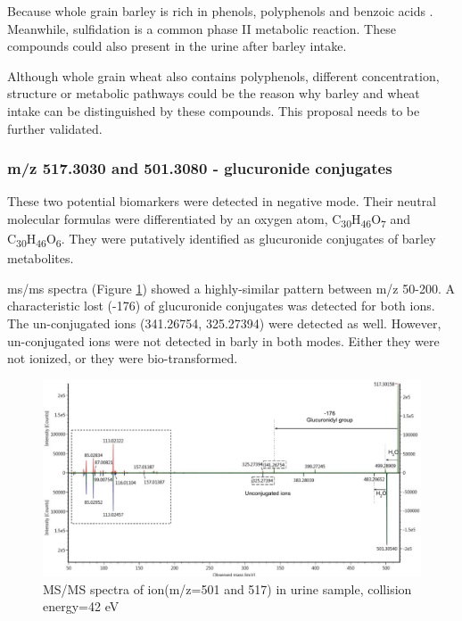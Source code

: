 Because whole grain barley is rich in phenols, polyphenols and benzoic acids \cite{Idehen2017}. Meanwhile, sulfidation is a common phase II metabolic reaction\cite{phase2}. These compounds could also present in the urine after barley intake.

Although whole grain wheat also contains polyphenols, different concentration, structure or metabolic pathways could be the reason why barley and wheat intake can be distinguished by these compounds. This proposal needs to be further validated.

\subsubsection{m/z 517.3030 and 501.3080 - glucuronide conjugates}
These two potential biomarkers were detected in negative mode. 
Their neutral molecular formulas were differentiated by an oxygen atom, C\textsubscript{30}H\textsubscript{46}O\textsubscript{7} and C\textsubscript{30}H\textsubscript{46}O\textsubscript{6}.
They were putatively identified as glucuronide conjugates of barley metabolites.

\acrshort{ms/ms} spectra (Figure \ref{fig:501517compare}) showed a highly-similar pattern between m/z 50-200. A characteristic lost  (-176) of glucuronide conjugates\cite{phase2} was detected for both ions. The un-conjugated ions (341.26754, 325.27394) were detected as well. However, un-conjugated ions were not detected in barly in both modes. Either they were not ionized, or they were bio-transformed.
\begin{figure}[h]
    \centering
    \includegraphics[scale=0.5]{images/501517compare.pdf}
    \caption{MS/MS spectra of ion(m/z=501 and 517) in urine sample, collision energy=42 eV}
    \label{fig:501517compare}
\end{figure}


